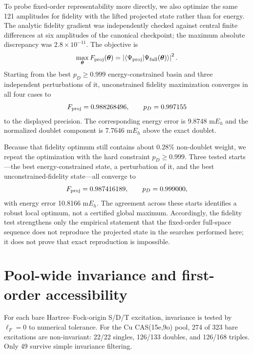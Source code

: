 \documentclass[
 aip,
 jcp,
 amsmath,amssymb,
 preprint
]{revtex4-2}
\begin{document}
To probe fixed-order representability more directly, we also optimize the same 121 amplitudes for fidelity with the lifted projected state rather than for energy.
The analytic fidelity gradient was independently checked against central finite differences at six amplitudes of the canonical checkpoint; the maximum absolute discrepancy was $2.8\times10^{-11}$.
The objective is
\begin{equation}
\max_{\boldsymbol\theta}
F_{\rm proj}(\boldsymbol\theta)
=
\left|
\langle\Psi_{\rm proj}|\Psi_{\rm full}(\boldsymbol\theta)\rangle
\right|^2 .
\end{equation}
Starting from the best $p_D\ge0.999$ energy-constrained basin and three independent perturbations of it, unconstrained fidelity maximization converges in all four cases to
\begin{equation}
F_{\rm proj}=0.988268496,\qquad p_D=0.997155
\end{equation}
to the displayed precision.
The corresponding energy error is 9.8748 m$E_h$ and the normalized doublet component is 7.7646 m$E_h$ above the exact doublet.

Because that fidelity optimum still contains about $0.28\%$ non-doublet weight, we repeat the optimization with the hard constraint $p_D\ge0.999$.
Three tested starts---the best energy-constrained state, a perturbation of it, and the best unconstrained-fidelity state---all converge to
\begin{equation}
F_{\rm proj}=0.987416189,\qquad p_D=0.999000,
\end{equation}
with energy error 10.8166 m$E_h$.
The agreement across these starts identifies a robust local optimum, not a certified global maximum.
Accordingly, the fidelity test strengthens only the empirical statement that the fixed-order full-space sequence does not reproduce the projected state in the searches performed here; it does not prove that exact reproduction is impossible.


\section{Pool-wide invariance and first-order accessibility}

For each bare Hartree--Fock-origin S/D/T excitation, invariance is tested by $\ell_F=0$ to numerical tolerance.
For the Cu CAS(15e,9o) pool, 274 of 323 bare excitations are non-invariant:
22/22 singles, 126/133 doubles, and 126/168 triples.
Only 49 survive simple invariance filtering.
\end{document}
